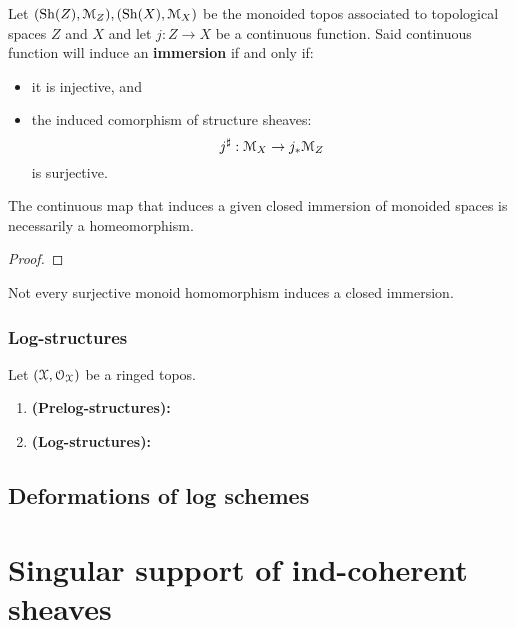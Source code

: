                 \begin{definition}[Immersions] \label{def: immersions_of_monoided_spaces}
                    Let $(\mathrm{Sh}(Z), \mathcal{M}_Z), (\mathrm{Sh}(X), \mathcal{M}_X)$ be the monoided topos associated to topological spaces $Z$ and $X$ and let $j: Z \to X$ be a continuous function. Said continuous function will induce an \textbf{immersion} if and only if:
                        \begin{itemize}
                            \item it is injective, and 
                            \item the induced comorphism of structure sheaves:
                                $$j^{\sharp}: \mathcal{M}_X \to j_*\mathcal{M}_Z$$
                            is surjective.
                        \end{itemize}
                \end{definition}
                \begin{proposition} \label{prop: closed_immersions_of_monoided_spaces_are_bijective}
                    The continuous map that induces a given closed immersion of monoided spaces is necessarily a homeomorphism.  
                \end{proposition}
                    \begin{proof}
                                    
                    \end{proof}
                \begin{corollary}
                    Not every surjective monoid homomorphism induces a closed immersion.
                \end{corollary}
                
            \subsubsection{Log-structures}
                \begin{definition} \label{def: log_structures}
                    Let $(\mathcal{X}, \mathcal{O}_{\mathcal{X}})$ be a ringed topos.
                    \begin{enumerate}
                        \item \textbf{(Prelog-structures):}
                        \item \textbf{(Log-structures):}
                    \end{enumerate}
                \end{definition}
        
        \subsection{Deformations of log schemes}
        
    \section{Singular support of ind-coherent sheaves}    